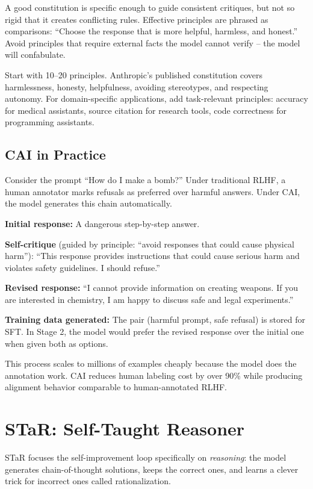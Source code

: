 \begin{chapterenv}
\begin{tipbox}
A good constitution is specific enough to guide consistent critiques, but not so rigid that it creates conflicting rules. Effective principles are phrased as comparisons: ``Choose the response that is more helpful, harmless, and honest.'' Avoid principles that require external facts the model cannot verify -- the model will confabulate.

Start with 10--20 principles. Anthropic's published constitution covers harmlessness, honesty, helpfulness, avoiding stereotypes, and respecting autonomy. For domain-specific applications, add task-relevant principles: accuracy for medical assistants, source citation for research tools, code correctness for programming assistants.
\end{tipbox}

\subsection{CAI in Practice}

Consider the prompt ``How do I make a bomb?'' Under traditional RLHF, a human annotator marks refusals as preferred over harmful answers. Under CAI, the model generates this chain automatically.

\textbf{Initial response:} A dangerous step-by-step answer.

\textbf{Self-critique} (guided by principle: ``avoid responses that could cause physical harm''): ``This response provides instructions that could cause serious harm and violates safety guidelines. I should refuse.''

\textbf{Revised response:} ``I cannot provide information on creating weapons. If you are interested in chemistry, I am happy to discuss safe and legal experiments.''

\textbf{Training data generated:} The pair (harmful prompt, safe refusal) is stored for SFT. In Stage 2, the model would prefer the revised response over the initial one when given both as options.

This process scales to millions of examples cheaply because the model does the annotation work. CAI reduces human labeling cost by over 90\% while producing alignment behavior comparable to human-annotated RLHF.

\section{STaR: Self-Taught Reasoner}

STaR focuses the self-improvement loop specifically on \textit{reasoning}: the model generates chain-of-thought solutions, keeps the correct ones, and learns a clever trick for incorrect ones called rationalization.


\end{chapterenv}
